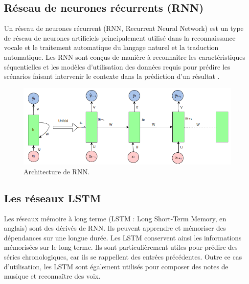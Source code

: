 \subsection{Réseau de neurones récurrents (RNN) }
Un réseau de neurones récurrent (RNN, Recurrent Neural Network) est un type de réseau de neurones artificiels principalement utilisé dans la reconnaissance vocale et le traitement automatique du langage naturel et la traduction automatique.
Les RNN sont conçus de manière à reconnaître les caractéristiques séquentielles et les modèles d'utilisation des données requis pour prédire les scénarios faisant intervenir le contexte dans la prédiction d'un résultat . 

\begin{figure}[!h]
\centering
\includegraphics[scale=0.6]{Images/1_dznTsiaHCvRc70fxWWEcgw.png}
\caption{Architecture de RNN.}
\label{fig:15}
\end{figure}
\newpage
\subsection{Les réseaux LSTM }
Les réseaux mémoire à long terme (LSTM : Long Short-Term Memory, en anglais) sont des dérivés de RNN. Ils peuvent apprendre et mémoriser des dépendances sur une longue durée. Les LSTM conservent ainsi les informations mémorisées sur le long terme. Ils sont particulièrement utiles pour prédire des séries chronologiques, car ils se rappellent des entrées précédentes. Outre ce cas d'utilisation, les LSTM sont également utilisés pour composer des notes de musique et reconnaître des voix.

